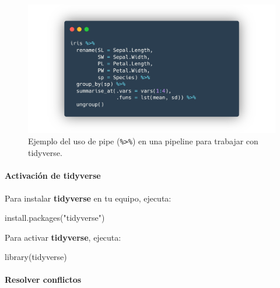 \documentclass[
]{article}
\newenvironment{Shaded}{\begin{snugshade}}{\end{snugshade}}
\newcommand{\FunctionTok}[1]{\textcolor[rgb]{0.00,0.00,0.00}{#1}}
\newcommand{\NormalTok}[1]{#1}
\newcommand{\StringTok}[1]{\textcolor[rgb]{0.31,0.60,0.02}{#1}}
\theoremstyle{definition}
\theoremstyle{definition}
\theoremstyle{definition}
\theoremstyle{definition}
\theoremstyle{remark}
\begin{document}
\begin{figure}

{\centering \includegraphics[width=1\linewidth]{figs/screenshots/pipeline ejemplo} 

}

\caption{Ejemplo del uso de pipe (\texttt{\%\textgreater{}\%}) en una pipeline para trabajar con tidyverse.}\label{fig:figura50}
\end{figure}

\hypertarget{activaciuxf3n-de-tidyverse}{%
\paragraph*{\texorpdfstring{Activación de \textbf{tidyverse}}{Activación de tidyverse}}\label{activaciuxf3n-de-tidyverse}}

Para instalar \textbf{tidyverse} en tu equipo, ejecuta:

\begin{Shaded}
\begin{Highlighting}[]
\FunctionTok{install.packages}\NormalTok{(}\StringTok{"tidyverse"}\NormalTok{)}
\end{Highlighting}
\end{Shaded}

Para activar \textbf{tidyverse}, ejecuta:

\begin{Shaded}
\begin{Highlighting}[]
\FunctionTok{library}\NormalTok{(tidyverse)}
\end{Highlighting}
\end{Shaded}

\hypertarget{resolver-conflictos}{%
\paragraph*{Resolver conflictos}\label{resolver-conflictos}}
\end{document}
